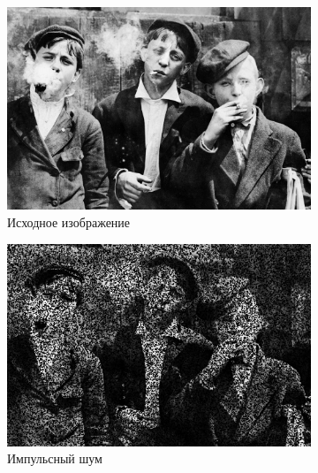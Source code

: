   \begin{figure}[ht] 
    \centering
    \begin{subfigure}[b]{0.5\linewidth}
        \centering
        \includegraphics[width=0.95\linewidth]{../lewis-hine-taschen-main-3.jpg} 
        \caption{Исходное изображение} 
        \label{contraharmonic_-0.85:a} 
        \vspace{4ex}
    \end{subfigure}%
    \begin{subfigure}[b]{0.5\linewidth}
      \centering
      \includegraphics[width=0.95\linewidth]{../Contraharmonic_Filter/Contraharmonic_Impulse_noise_(m,n=(3,_3),q=-0.85).jpg} 
      \caption{Импульсный шум} 
      \label{contraharmonic_-0.85:b} 
      \vspace{4ex}
    \end{subfigure}
    \begin{subfigure}[b]{0.5\linewidth}
      \centering

\end{subfigure}
\end{figure}
